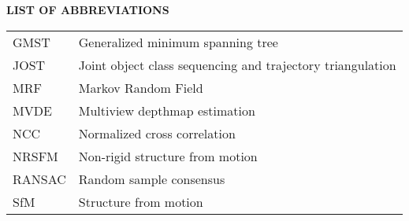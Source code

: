 
{}

\begin{center}
\textbf{LIST OF ABBREVIATIONS}
\vspace{16pt}
\end{center}

\noindent
\begin{tabular}{@{}p{0.8in} l}

GMST & Generalized minimum spanning tree \\
JOST & Joint object class sequencing and trajectory triangulation \\
MRF & Markov Random Field \\
MVDE & Multiview depthmap estimation \\
NCC & Normalized cross correlation \\
NRSFM & Non-rigid structure from motion \\
RANSAC & Random sample consensus \\
SfM & Structure from motion \\
\end{tabular}

\clearpage
